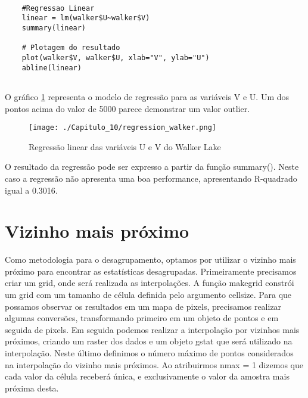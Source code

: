 \begin{scriptsize}
	\estiloR
	\begin{lstlisting}[caption={Criação de um vetor em R}, label=lst:rcode]
	
	#Regressao Linear
	linear = lm(walker$U~walker$V)
	summary(linear)
	
	# Plotagem do resultado
	plot(walker$V, walker$U, xlab="V", ylab="U")
	abline(linear)
	
	\end{lstlisting}
\end{scriptsize}


O gráfico \ref{regressao}  representa o modelo de regressão para as variáveis V e U. Um dos pontos acima do valor de 5000 parece demonstrar um valor outlier. 


\FloatBarrier
\begin{figure}[H]
	\centering
	\texttt{[image: ./Capitulo\_10/regression\_walker.png]}	
	\caption{Regressão linear das variáveis U e V do Walker Lake}
	\label{regressao}
\end{figure}
\FloatBarrier

O resultado da regressão pode ser expresso a partir da função summary(). Neste caso a regressão não apresenta uma boa performance, apresentando R-quadrado igual a 0.3016. 

\begingroup
{}

\endgroup


\section{Vizinho mais próximo} 

Como metodologia para o desagrupamento, optamos por utilizar o vizinho mais próximo para encontrar as estatísticas desagrupadas. Primeiramente precisamos criar um grid, onde será realizada as interpolações. A função makegrid constrói um grid com um tamanho de célula definida pelo argumento cellsize. Para que possamos observar os resultados em um mapa de pixels, precisamos realizar algumas conversões, transformando primeiro em um objeto de pontos e em seguida de pixels. Em seguida podemos realizar a interpolação por vizinhos mais próximos, criando um raster dos dados e um objeto gstat que será utilizado na interpolação. Neste último definimos o número máximo de pontos considerados na interpolação do vizinho mais próximos. Ao atribuirmos nmax = 1 dizemos que cada valor da célula receberá única, e exclusivamente o valor da amostra mais próxima desta.

